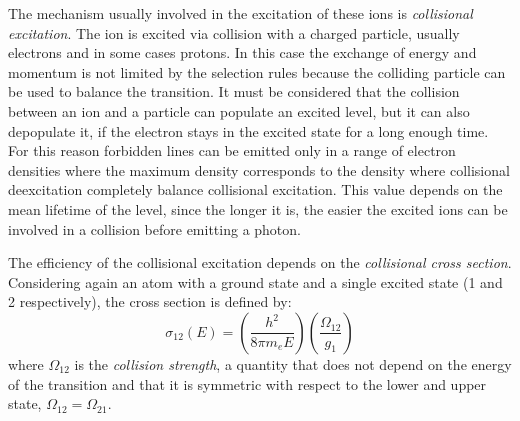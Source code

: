 \documentclass[../main.tex]{subfiles}
\begin{document}
The mechanism usually involved in the excitation of these ions is \emph{collisional excitation}.
The ion is excited via collision with a charged particle, usually electrons and in some cases protons.
In this case the exchange of energy and momentum is not limited by the selection rules because the colliding particle can be used to balance the transition.
It must be considered that the collision between an ion and a particle can populate an excited level, but it can also depopulate it, if the electron stays in the excited state for a long enough time.
For this reason forbidden lines can be emitted only in a range of electron densities where the maximum density corresponds to the density where collisional deexcitation completely balance collisional excitation.
This value depends on the mean lifetime of the level, since the longer it is, the easier the excited ions can be involved in a collision before emitting a photon.

The efficiency of the collisional excitation depends on the \emph{collisional cross section}.
Considering again an atom with a ground state and a single excited state (1 and 2 respectively), the cross section is defined by:
\begin{equation}
    \label{eq:crosssection}
    \sigma_{12}(E) = \left(\frac{h^2}{8\pi m_e E}\right)\left(\frac{\Omega_{12}}{g_1}\right)
\end{equation}
where $\Omega_{12}$ is the \emph{collision strength}, a quantity that does not depend on the energy of the transition and that it is symmetric with respect to the lower and upper state, $\Omega_{12} = \Omega_{21}$.
\end{document}
